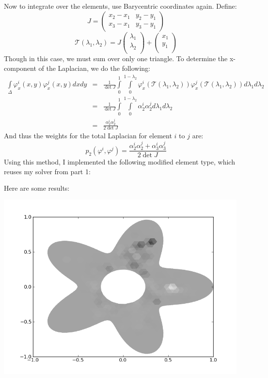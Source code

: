 \documentclass{article}
\begin{document}
Now to integrate over the elements, use Barycentric coordinates again.  Define:
\[ J = \left( \begin{array}{cc}
x_2 - x_1 & y_2 - y_1 \\
x_3 - x_1 & y_3 - y_1
\end{array} \right) \]
\[ \mathcal{T}(\lambda_1, \lambda_2) = J \left( \begin{array}{c}
\lambda_1 \\
\lambda_2 \\
\end{array} \right) + \left( \begin{array}{c}
x_1 \\
y_1 \\
\end{array} \right) \]
Though in this case, we must sum over only one triangle.  To determine the x-component of the Laplacian, we do the following:
\begin{eqnarray*}
\int \limits_{\Delta} \varphi^i_{x}(x,y) \varphi^j_{x}(x,y) dx dy 
& = &
	\frac{1}{\det J} \int \limits_0^1 \int \limits_0^{1-\lambda_2}
		\varphi^i_{x}(\mathcal{T}(\lambda_1, \lambda_2)) 
		\varphi^j_{x}(\mathcal{T}(\lambda_1, \lambda_2)) d \lambda_1 d \lambda_2 \\
& = & 
	\frac{1}{\det J} \int \limits_{0}^{1} \int \limits_0^{1 - \lambda_2} 
		\alpha^i_2 \alpha^j_2 d \lambda_1 d \lambda_2 \\
& = & \frac{\alpha^i_2 \alpha^j_2}{2 \det J}
\end{eqnarray*}
And thus the weights for the total Laplacian for element $i$ to $j$ are:
\[ p_2(\varphi^i, \varphi^j) = \frac{\alpha^i_2 \alpha^j_2 + \alpha^i_3 \alpha^j_3}{2 \det J} \]
Using this method, I implemented the following modified element type, which reuses my solver from part 1:





Here are some results:
\begin{center}
\includegraphics[width=5in]{prob3_result.png}
\end{center}
\end{document}
